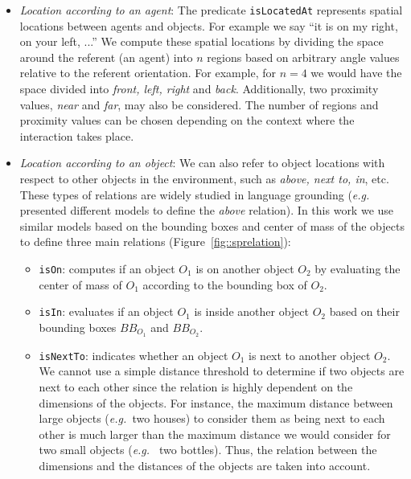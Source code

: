 \documentclass[twocolumn]{svjour3}
\newcommand{\concept}[1]{{\footnotesize \texttt{#1}}}
\newcommand{\eg}{{\textit{e.g.~}}}
\begin{document}
\begin{itemize} 

\item \emph{Location according to an agent}: The predicate
\concept{isLocatedAt} represents spatial locations between agents and objects.
For example we say ``it is on my right, on your left, ...'' We compute these
spatial locations by dividing the space around the referent (an agent) into $n$
regions based on arbitrary angle values relative to the referent orientation.
For example, for $n = 4$ we would have the space divided into \emph{front,
left, right} and \emph{back}. Additionally, two proximity values, \emph{near}
and \emph{far}, may also be considered. The number of regions and proximity
values can be chosen depending on the context where the interaction takes
place.

\item \emph{Location according to an object}: We can also refer to object
locations with respect to other objects in the environment, such as \emph{above,
next to, in}, etc. These types of relations are widely studied in language
grounding (\eg \cite{Regier01} presented different models to define the
\emph{above} relation). In this work we use similar models based on the
bounding boxes and center of mass of the objects to define three main relations
(Figure~\ref{fig::sprelation}): 

\begin{itemize}
	\item \concept{isOn}: computes if an object $O_1$ is on another object $O_2$ by
	evaluating the center of mass of $O_1$ according to the bounding box of $O_2$.

	\item \concept{isIn}: evaluates if an object $O_1$ is inside another object
	$O_2$ based on their bounding boxes $BB_{O_1}$ and $BB_{O_2}$.

	\item \concept{isNextTo}: indicates whether an object $O_1$ is next to another
	object $O_2$. We cannot use a simple distance threshold to determine if two
	objects are next to each other since the relation is highly dependent on the
	dimensions of the objects. For instance, the maximum distance between large
	objects (\eg two houses) to consider them as being next to each other is much
	larger than the maximum distance we would consider for two small objects (\eg
	two bottles). Thus, the relation between the dimensions and the distances of
	the objects are taken into account.  


\end{itemize}
\end{itemize}
\end{document}
